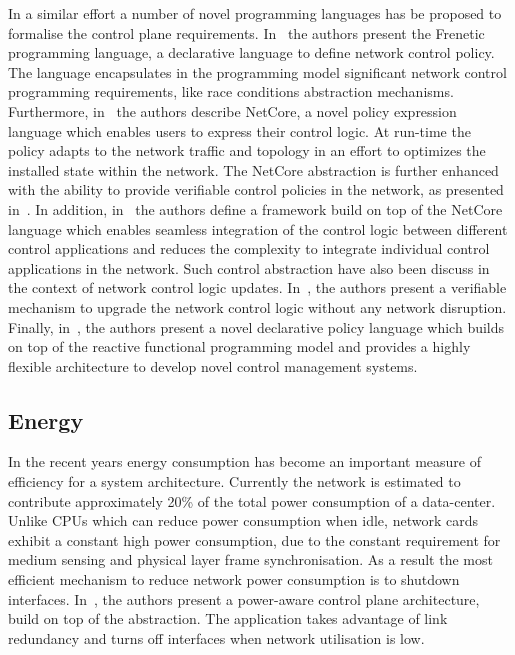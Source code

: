 In a similar effort a number of novel programming languages has be proposed to
formalise the control plane requirements.  In~\cite{Foster11} the authors
present the Frenetic programming language, a declarative language to define
network control policy. The language encapsulates in the programming model
significant network control programming requirements, like race conditions
abstraction mechanisms. Furthermore, in~\cite{Monsanto12a} the authors describe
NetCore, a novel policy expression language which enables users to express their
control logic. At run-time the policy adapts to the network traffic and topology
in an effort to optimizes the installed state within the network.  The NetCore
abstraction is further enhanced with the ability to provide verifiable control
policies in the network, as presented in~\cite{Guha13}. In addition,
in~\cite{Monsanto13} the authors define a framework build on top of the NetCore
language which enables seamless integration of the control logic between
different control applications and reduces the complexity to integrate
individual control applications in the network. Such control abstraction have
also been discuss in the context of network control logic updates.
In~\cite{Reitblatt12}, the authors present a verifiable mechanism to upgrade the
network control logic without any network disruption. Finally,
in~\cite{Voellmy12}, the authors present a novel declarative policy language
which builds on top of the reactive functional programming model and provides a
highly flexible architecture to develop novel control management systems. 

\subsection{Energy}

In the recent years energy consumption has become an important measure of
efficiency for a system architecture. Currently the network is estimated to
contribute approximately 20\% of the total power consumption of a data-center.
Unlike CPUs which can reduce power consumption when idle, network cards exhibit
a constant high power consumption, due to the constant requirement for medium
sensing and physical layer frame synchronisation. As a result the most efficient
mechanism to reduce network power consumption is to shutdown interfaces.
In~\cite{Heller10}, the authors present a power-aware control plane
architecture, build on top of the \of abstraction. The application takes
advantage of link redundancy and turns off interfaces when network utilisation
is low. 

